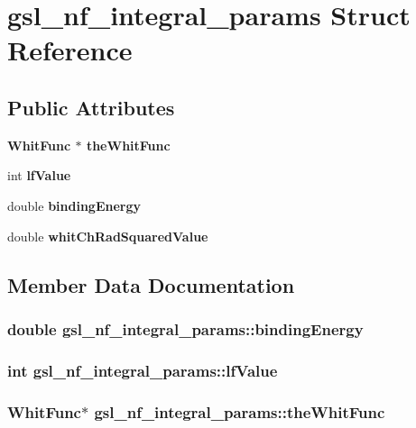 \section{gsl\_\-nf\_\-integral\_\-params Struct Reference}
\label{structgsl__nf__integral__params}
\subsection*{Public Attributes}
\begin{CompactItemize}
\item 
\bf{Whit\-Func} $\ast$ \bf{the\-Whit\-Func}
\item 
int \bf{lf\-Value}
\item 
double \bf{binding\-Energy}
\item 
double \bf{whit\-Ch\-Rad\-Squared\-Value}
\end{CompactItemize}


\subsection{Member Data Documentation}
\subsubsection{\setlength{\rightskip}{0pt plus 5cm}double \bf{gsl\_\-nf\_\-integral\_\-params::binding\-Energy}}\label{structgsl__nf__integral__params_a898dbf97c7ed33f1b7e2dd050824d52}


\subsubsection{\setlength{\rightskip}{0pt plus 5cm}int \bf{gsl\_\-nf\_\-integral\_\-params::lf\-Value}}\label{structgsl__nf__integral__params_60e6327d7fc180b113422f08a187a8ca}


\subsubsection{\setlength{\rightskip}{0pt plus 5cm}\bf{Whit\-Func}$\ast$ \bf{gsl\_\-nf\_\-integral\_\-params::the\-Whit\-Func}}\label{structgsl__nf__integral__params_fa618488a6c63be17951dc93b79eac93}


